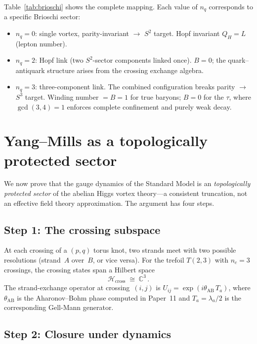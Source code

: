 \documentclass[11pt]{article}
\begin{document}
Table~\ref{tab:brioschi} shows the complete mapping.  Each value
of $n_q$ corresponds to a specific Brioschi sector:
\begin{itemize}
\item $n_q = 0$: single vortex, parity-invariant $\to$ $S^2$ target.
      Hopf invariant $Q_H = L$ (lepton number).
\item $n_q = 2$: Hopf link (two $S^2$-sector components linked once).
      $B = 0$; the quark--antiquark structure arises from the crossing
      exchange algebra.
\item $n_q = 3$: three-component link.  The combined configuration
      breaks parity $\to$ $S^3$ target.  Winding number $= B = 1$
      for true baryons; $B = 0$ for the $\tau$, where
      $\gcd(3,4) = 1$ enforces complete confinement and purely weak
      decay.
\end{itemize}


\section{Yang--Mills as a topologically protected sector}
\label{sec:yangmills}

We now prove that the gauge dynamics of the Standard Model is an
\emph{topologically protected sector} of the abelian Higgs vortex
theory---a consistent truncation, not an effective field theory
approximation.  The argument has four steps.

\subsection{Step 1: The crossing subspace}

At each crossing of a $(p,q)$ torus knot, two strands meet with two
possible resolutions (strand~$A$ over~$B$, or vice versa).  For the
trefoil $T(2,3)$ with $n_c = 3$ crossings, the crossing states span
a Hilbert space
\begin{equation}
\mathcal{H}_\text{cross} \;\cong\; \mathbb{C}^3\,.
\end{equation}
The strand-exchange operator at crossing~$(i,j)$ is
$U_{ij} = \exp(i\theta_\text{AB}\,T_a)$, where $\theta_\text{AB}$ is
the Aharonov--Bohm phase computed in Paper~11 and $T_a = \lambda_a/2$
is the corresponding Gell-Mann generator.

\subsection{Step 2: Closure under dynamics}
\end{document}
